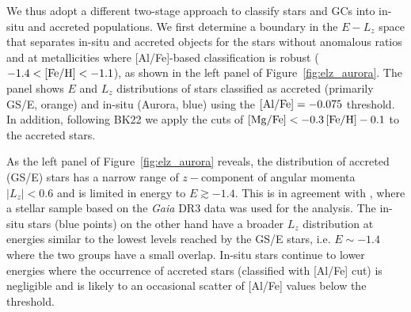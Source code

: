 \documentclass[a4paper,useAMS,usenatbib]{mnras}
\begin{document}
We thus adopt a different two-stage approach to classify stars and GCs into in-situ and accreted populations. We first determine a boundary in the $E-L_z$ space that separates in-situ and accreted objects for the stars without anomalous ratios and at metallicities where [Al/Fe]-based classification is robust ($-1.4<{\rm [Fe/H]}<-1.1$), as shown in the left panel of  
Figure~\ref{fig:elz_aurora}. The panel shows $E$ and $L_z$ distributions of stars classified as accreted (primarily GS/E, orange) and in-situ (Aurora, blue) using the $\rm [Al/Fe]=-0.075$ threshold. In addition, following BK22  we apply the cuts of  $\rm [Mg/Fe]<-0.3\,[Fe/H]-0.1$ to the accreted stars. 

As the left panel of Figure~\ref{fig:elz_aurora} reveals,  the distribution of accreted (GS/E) stars has a narrow range of $z-$component of angular momenta $\vert L_z\vert<0.6$ and is limited in energy to $E\gtrsim -1.4$. This is in agreement with \citet{wrinkles}, where a stellar sample based on the {\it Gaia} DR3 data was used for the analysis. The in-situ stars (blue points) on the other hand have a broader $L_z$ distribution at energies similar to the lowest levels reached by the GS/E stars, i.e. $E\sim-1.4$ where the two groups have a small overlap. In-situ stars continue to lower energies where the occurrence of accreted stars (classified with [Al/Fe] cut) is negligible and is likely to an occasional scatter of [Al/Fe] values below the threshold. 
\end{document}
